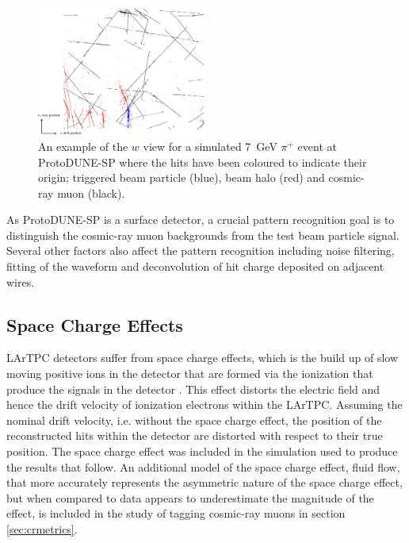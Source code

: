 \begin{figure}
\centering
\includegraphics[width=0.5\textwidth]{Figures/EventDisplays/MC/EventComposition.pdf}
\caption{An example of the $w$ view for a simulated 7~GeV $\pi^{+}$ event at ProtoDUNE-SP where the hits have been coloured to indicate their origin; triggered beam particle (blue), beam halo (red) and cosmic-ray muon (black).}
\label{fig:eventdecomp}
\end{figure}

As ProtoDUNE-SP is a surface detector, a crucial pattern recognition goal is to distinguish the cosmic-ray muon backgrounds from the test beam particle signal.  Several other factors also affect the pattern recognition including noise filtering, fitting of the waveform and deconvolution of hit charge deposited on adjacent wires.  


\subsection{Space Charge Effects}
LArTPC detectors suffer from space charge effects, which is the build up of slow moving positive ions in the detector that are formed via the ionization that produce the signals in the detector \cite{spacecharge}.  This effect distorts the electric field and hence the drift velocity of ionization electrons within the LArTPC.  Assuming the nominal drift velocity, i.e. without the space charge effect, the position of the reconstructed hits within the detector are distorted with respect to their true position.  The space charge effect was included in the simulation used to produce the results that follow.  An additional model of the space charge effect, fluid flow, that more accurately represents the asymmetric nature of the space charge effect, but when compared to data appears to underestimate the magnitude of the effect, is included in the study of tagging cosmic-ray muons in section \ref{sec:crmetrics}. 

